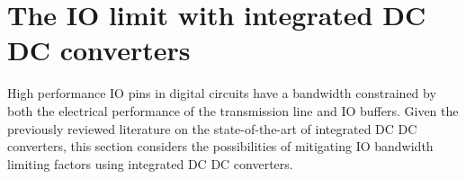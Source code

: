\documentclass[letterpaper,twocolumn,10pt]{article}
\begin{document}

\section{The IO limit with integrated DC DC converters}

High performance IO pins in digital circuits have a bandwidth constrained by both the electrical performance of the transmission line and IO buffers. Given the previously reviewed literature on the state-of-the-art of integrated DC DC converters, this section considers the possibilities of mitigating IO bandwidth limiting factors using integrated DC DC converters.
\end{document}
